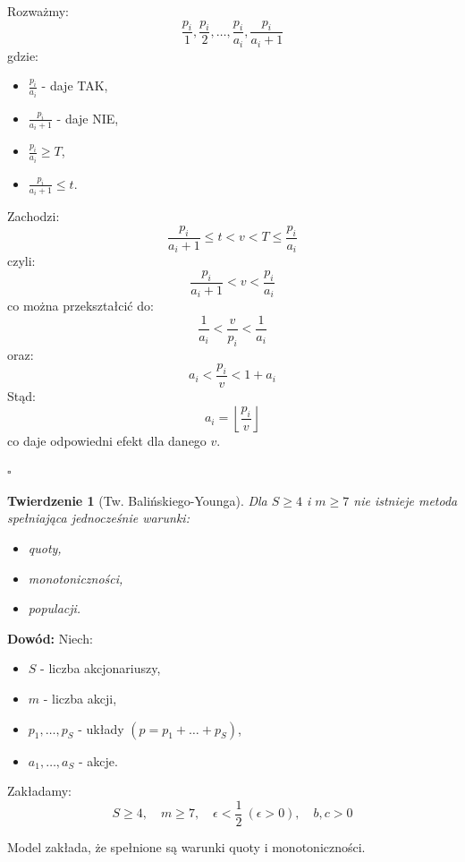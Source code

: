 \documentclass[12pt,a4paper]{article}
\theoremstyle{break}
\newtheorem{theorem}{Twierdzenie}[section]
\begin{document}
	Rozważmy:
	\[
	\frac{p_i}{1}, \frac{p_i}{2}, \dots, \frac{p_i}{a_i}, \frac{p_i}{a_i + 1}
	\]
	gdzie:
	\begin{itemize}
		\item $\frac{p_i}{a_i}$ - daje TAK,
		\item $\frac{p_i}{a_i + 1}$ - daje NIE,
		\item $\frac{p_i}{a_i} \geq T$,
		\item $\frac{p_i}{a_i + 1} \leq t$.
	\end{itemize}
	
	Zachodzi:
	\[
	\frac{p_i}{a_i + 1} \leq t < v < T \leq \frac{p_i}{a_i}
	\]
	czyli:
	\[
	\frac{p_i}{a_i + 1} < v < \frac{p_i}{a_i}
	\]
	co można przekształcić do:
	\[
	\frac{1}{a_i} < \frac{v}{p_i} < \frac{1}{a_i}
	\]
	oraz:
	\[
	a_i < \frac{p_i}{v} < 1 + a_i
	\]
	Stąd:
	\[
	a_i = \left\lfloor \frac{p_i}{v} \right\rfloor
	\]
	co daje odpowiedni efekt dla danego $v$.
	
	\begin{flushright}
		$\square$
	\end{flushright}

	\begin{theorem}[Tw. Balińskiego-Younga]
	Dla $S \geq 4$ i $m \geq 7$ nie istnieje metoda spełniająca jednocześnie warunki:
	\begin{itemize}
		\item quoty,
		\item monotoniczności,
		\item populacji.
	\end{itemize}
	\end{theorem}
	
	\noindent \textbf{Dowód:} Niech:
	\begin{itemize}
		\item $S$ - liczba akcjonariuszy,
		\item $m$ - liczba akcji,
		\item $p_1, \dots, p_S$ - układy $(p = p_1 + \dots + p_S)$,
		\item $a_1, \dots, a_S$ - akcje.
	\end{itemize}
	
	Zakładamy:
	\[
	S \geq 4, \quad m \geq 7, \quad \epsilon < \frac{1}{2} \ (\epsilon > 0), \quad b, c > 0
	\]
	
	Model zakłada, że spełnione są warunki quoty i monotoniczności.
	
\end{document}
